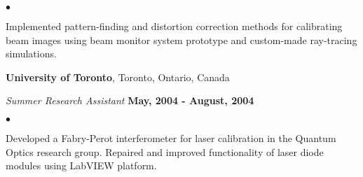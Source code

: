 \documentclass[margin,line]{res}
\newenvironment{list2}{
  \begin{list}{$\bullet$}{%
      \setlength{\itemsep}{0in}
      \setlength{\parsep}{0in} \setlength{\parskip}{0in}
      \setlength{\topsep}{0in} \setlength{\partopsep}{0in}
      \setlength{\leftmargin}{0.2in}}}{\end{list}}
\begin{document}
\begin{resume}
\begin{list2}
\item Implemented pattern-finding and distortion correction methods
  for calibrating beam images using beam monitor system prototype and
  custom-made ray-tracing simulations.
\end{list2}


%

{\bf University of Toronto}, Toronto, Ontario, Canada

\vspace{-.3cm}
{\em Summer Research Assistant} \hfill {\bf May, 2004 - August, 2004}\\
\vspace*{-2mm}
\begin{list2}
\item Developed a Fabry-Perot interferometer for laser calibration in
  the Quantum Optics research group.  Repaired and improved
  functionality of laser diode modules using LabVIEW platform.
\end{list2}



\end{resume}
\end{document}
